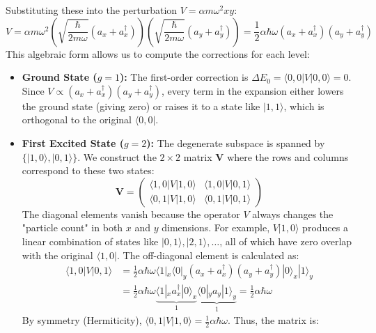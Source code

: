 \begin{solution}
Substituting these into the perturbation $V = \alpha m\omega^2 x y$:
\begin{equation*}
    V = \alpha m\omega^2 \left( \sqrt{\frac{\hbar}{2m\omega}} (a_x + a_x^\dagger) \right) \left( \sqrt{\frac{\hbar}{2m\omega}} (a_y + a_y^\dagger) \right) = \frac{1}{2} \alpha \hbar\omega (a_x + a_x^\dagger)(a_y + a_y^\dagger)
\end{equation*}
This algebraic form allows us to compute the corrections for each level:

\begin{itemize}
    \item \textbf{Ground State ($g=1$):} The first-order correction is $\Delta E_0 = \langle 0, 0 | V | 0, 0 \rangle = 0$. Since $V \propto (a_x + a_x^\dagger)(a_y + a_y^\dagger)$, every term in the expansion either lowers the ground state (giving zero) or raises it to a state like $|1, 1\rangle$, which is orthogonal to the original $\langle 0, 0 |$.
    \item \textbf{First Excited State ($g=2$):} The degenerate subspace is spanned by $\{|1, 0\rangle, |0, 1\rangle\}$. We construct the $2 \times 2$ matrix $\mathbf{V}$ where the rows and columns correspond to these two states:
    \begin{equation*}
        \mathbf{V} = \begin{pmatrix} 
            \langle 1, 0 | V | 1, 0 \rangle & \langle 1, 0 | V | 0, 1 \rangle \\
            \langle 0, 1 | V | 1, 0 \rangle & \langle 0, 1 | V | 0, 1 \rangle
        \end{pmatrix}
    \end{equation*}
    The diagonal elements vanish because the operator $V$ always changes the "particle count" in both $x$ and $y$ dimensions. For example, $V|1, 0\rangle$ produces a linear combination of states like $|0, 1\rangle, |2, 1\rangle, \dots$, all of which have zero overlap with the original $\langle 1, 0 |$.
    The off-diagonal element is calculated as:
    \begin{align*}
        \langle 1, 0 | V | 0, 1 \rangle &= \frac{1}{2} \alpha \hbar\omega \langle 1|_x \langle 0|_y (a_x + a_x^\dagger)(a_y + a_y^\dagger) |0\rangle_x |1\rangle_y \\
        &= \frac{1}{2} \alpha \hbar\omega \underbrace{\langle 1|_x a_x^\dagger |0\rangle_x}_{1} \underbrace{\langle 0|_y a_y |1\rangle_y}_{1} = \frac{1}{2} \alpha \hbar\omega
    \end{align*}
    By symmetry (Hermiticity), $\langle 0, 1 | V | 1, 0 \rangle = \frac{1}{2} \alpha \hbar\omega$. Thus, the matrix is:

\end{itemize}
\end{solution}
